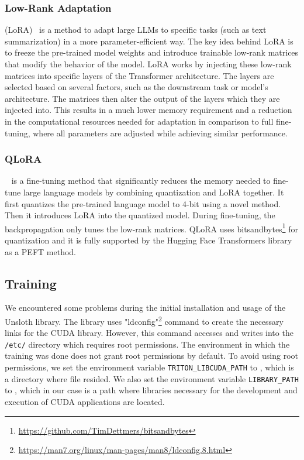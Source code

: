 \documentclass[english, ba, kiv, he, iso690numb, pdf, viewonly]{fasthesis}
\begin{document}
\subsubsection{Low-Rank Adaptation}\label{impl:lora}
 (LoRA)~\cite{hu2021lora} is a method to adapt large LLMs to specific tasks (such as text summarization) in a more parameter-efficient way. The key idea behind LoRA is to freeze the pre-trained model weights and introduce trainable low-rank matrices that modify the behavior of the model. LoRA works by injecting these low-rank matrices into specific layers of the Transformer architecture. The layers are selected based on several factors, such as the downstream task or model's architecture. The matrices then alter the output of the layers which they are injected into. This results in a much lower memory requirement and a reduction in the computational resources needed for adaptation in comparison to full fine-tuning, where all parameters are adjusted while achieving similar performance.
\subsubsection{QLoRA}
~\cite{dettmers2023qlora} is a fine-tuning method that significantly reduces the memory needed to fine-tune large language models by combining quantization and LoRA together. It first quantizes the pre-trained language model to 4-bit using a novel method. Then it introduces LoRA into the quantized model. During fine-tuning, the backpropagation only tunes the low-rank matrices. QLoRA uses bitsandbytes\footnote{\url{https://github.com/TimDettmers/bitsandbytes}} for quantization and it is fully supported by the Hugging Face Transformers library as a PEFT method.
\subsection{Training}
We encountered some problems during the initial installation and usage of the Unsloth library. The library uses \command"ldconfig"\footnote{\url{https://man7.org/linux/man-pages/man8/ldconfig.8.html}} command to create the necessary links for the CUDA library. However, this command accesses and writes into the \texttt{/etc/} directory which requires root permissions. The environment in which the training was done does not grant root permissions by default. To avoid using root permissions, we set the environment variable \texttt{TRITON\_LIBCUDA\_PATH} to , which is a directory where  file resided. We also set the environment variable \texttt{LIBRARY\_PATH} to , which in our case is a path where libraries necessary for the development and execution of CUDA applications are located.
\end{document}
